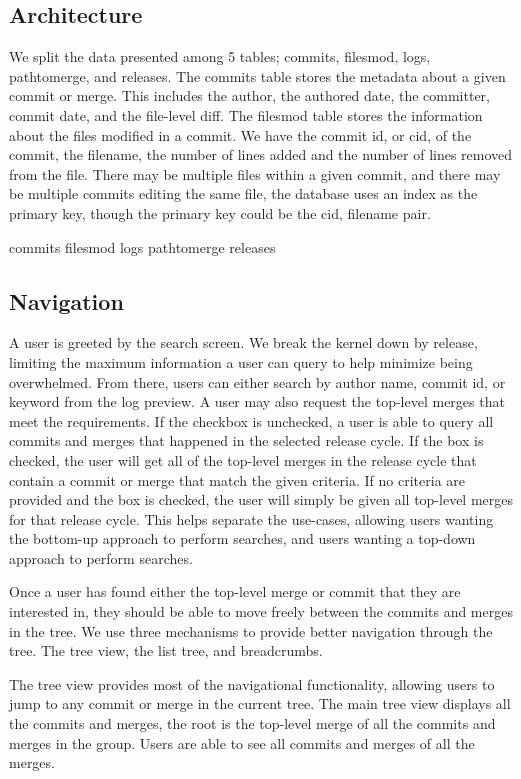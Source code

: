 \documentclass[conference, draftclsnofoot]{IEEEtran}
\begin{document}
\subsection{Architecture}

We split the data presented among 5 tables; commits, filesmod, logs,
pathtomerge, and releases. The commits table stores the metadata about a given
commit or merge. This includes the author, the authored date, the committer,
commit date, and the file-level diff. The filesmod table stores the information
about the files modified in a commit. We have the commit id, or cid, of the
commit, the filename, the number of lines added and the number of lines removed
from the file. There may be multiple files within a given commit, and there may
be multiple commits editing the same file, the database uses an index as the
primary key, though the primary key could be the cid, filename pair.

commits
filesmod
logs
pathtomerge
releases


\subsection{Navigation}

A user is greeted by the search screen. We break the kernel down by release,
limiting the maximum information a user can query to help minimize being
overwhelmed. From there, users can either search by author name, commit id, or
keyword from the log preview. A user may also request the top-level merges that
meet the requirements. If the checkbox is unchecked, a user is able to query
all commits and merges that happened in the selected release cycle. If the box
is checked, the user will get all of the top-level merges in the release cycle
that contain a commit or merge that match the given criteria. If no criteria
are provided and the box is checked, the user will simply be given all
top-level merges for that release cycle. This helps separate the use-cases,
allowing users wanting the bottom-up approach to perform searches, and users
wanting a top-down approach to perform searches.

Once a user has found either the top-level merge or commit that they are
interested in, they should be able to move freely between the commits and
merges in the tree. We use three mechanisms to provide better navigation
through the tree. The tree view, the list tree, and breadcrumbs.

The tree view provides most of the
navigational functionality, allowing users to jump to any commit or merge in
the current tree. The main tree view displays all the commits and merges, the
root is the top-level merge of all the commits and merges in the group. Users
are able to see all commits and merges of all the merges.
\end{document}
